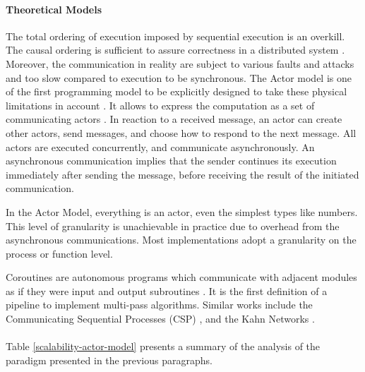 \paragraph{Theoretical Models}

The total ordering of execution imposed by sequential execution is an overkill.
The causal ordering is sufficient to assure correctness in a distributed system \cite{Lamport1978,Reed2012}.
Moreover, the communication in reality are subject to various faults and attacks \cite{Lamport1982} and too slow compared to execution to be synchronous.
The Actor model is one of the first programming model to be explicitly designed to take these physical limitations in account \cite{Hewitt1977a}.
It allows to express the computation as a set of communicating actors \cite{Hewitt1973a, Hewitt1977, Clinger1981}.
In reaction to a received message, an actor can create other actors, send messages, and choose how to respond to the next message.
All actors are executed concurrently, and communicate asynchronously.
An asynchronous communication implies that the sender continues its execution immediately after sending the message, before receiving the result of the initiated communication.

In the Actor Model, everything is an actor, even the simplest types like numbers.
This level of granularity is unachievable in practice due to overhead from the asynchronous communications.
Most implementations adopt a granularity on the process or function level.

Coroutines are autonomous programs which communicate with adjacent modules as if they were input and output subroutines \cite{Conway1963}.
It is the first definition of a pipeline to implement multi-pass algorithms.
Similar works include the Communicating Sequential Processes (CSP) \cite{Hoare1978, Brookes1984}, and the Kahn Networks \cite{Kahn1974, Kahn1976}.


\paragraph{}

Table \ref{scalability-actor-model} presents a summary of the analysis of the paradigm presented in the previous paragraphs.

